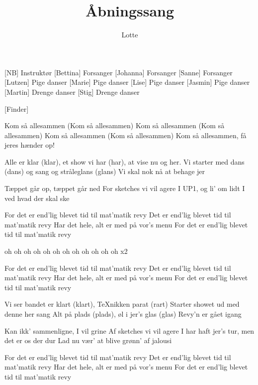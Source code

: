 \documentclass[a4paper,11pt]{article}
\title{Åbningssang}
\author{Lotte}
\begin{document}
\maketitle

\begin{roles}
[NB] Instruktør
[Bettina] Forsanger
[Johanna] Forsanger
[Sanne] Forsanger
[Lutzen] Pige danser
[Marie] Pige danser
[Lise] Pige danser
[Jasmin] Pige danser
[Martin] Drenge danser
[Stig] Drenge danser
\end{roles}

\begin{props}
[Finder]
\end{props}

\begin{song}
Kom så allesammen (Kom så allesammen)
Kom så allesammen (Kom så allesammen)
Kom så allesammen (Kom så allesammen)
Kom så allesammen, få jeres hænder op!

Alle er klar (klar), et show vi har (har), at vise nu og her.
Vi starter med dans (dans) og sang og stråleglans (glans)
Vi skal nok nå at behage jer

Tæppet går op, tæppet går ned
For sketches vi vil agere
I UP1, og li' om lidt
I ved hvad der skal ske

For det er end'lig blevet tid til mat'matik revy
Det er end'lig blevet tid til mat'matik revy
Har det hele, alt er med på vor's menu
For det er end'lig blevet tid til mat'matik revy

oh oh oh oh oh oh oh oh oh oh oh oh x2

For det er end'lig blevet tid til mat'matik revy
Det er end'lig blevet tid til mat'matik revy
Har det hele, alt er med på vor's menu
For det er end'lig blevet tid til mat'matik revy

Vi ser bandet er klart (klart), TeXnikken parat (rart)
Starter showet ud med denne her sang
Alt på plads (plads), øl i jer's glas (glas)
Revy'n er gået igang

Kan ikk' sammenligne, I vil grine
Af sketches vi vil agere
I har haft jer's tur, men det er os der dur
Lad nu vær' at blive grønn' af jalousi

For det er end'lig blevet tid til mat'matik revy
Det er end'lig blevet tid til mat'matik revy
Har det hele, alt er med på vor's menu
For det er end'lig blevet tid til mat'matik revy


\end{song}
\end{document}
